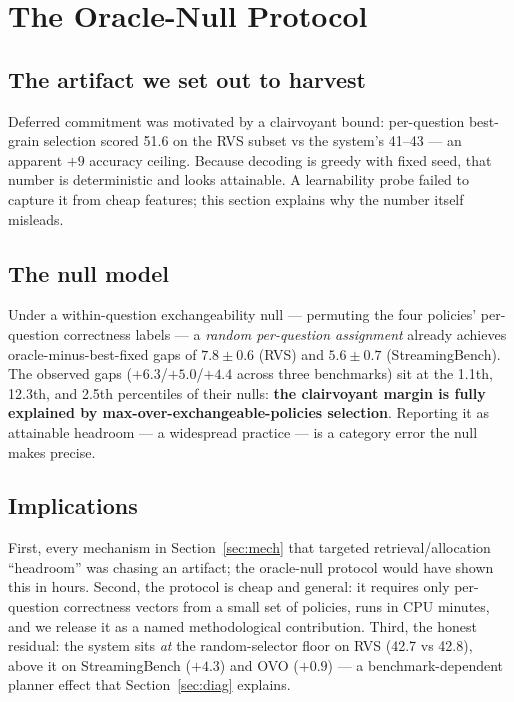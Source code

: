 \section{The Oracle-Null Protocol}
\label{sec:null}

\subsection{The artifact we set out to harvest}
Deferred commitment was motivated by a clairvoyant bound: per-question best-grain selection scored 51.6 on the RVS subset vs the system's 41--43 — an apparent $+9$ accuracy ceiling. Because decoding is greedy with fixed seed, that number is deterministic and looks attainable. A learnability probe failed to capture it from cheap features; this section explains why the number itself misleads.

\subsection{The null model}
Under a within-question exchangeability null — permuting the four policies' per-question correctness labels — a \emph{random per-question assignment} already achieves oracle-minus-best-fixed gaps of $7.8\pm0.6$ (RVS) and $5.6\pm0.7$ (StreamingBench). The observed gaps ($+6.3$/$+5.0$/$+4.4$ across three benchmarks) sit at the 1.1th, 12.3th, and 2.5th percentiles of their nulls: \textbf{the clairvoyant margin is fully explained by max-over-exchangeable-policies selection}. Reporting it as attainable headroom — a widespread practice — is a category error the null makes precise.

\subsection{Implications}
First, every mechanism in Section~\ref{sec:mech} that targeted retrieval/allocation ``headroom'' was chasing an artifact; the oracle-null protocol would have shown this in hours. Second, the protocol is cheap and general: it requires only per-question correctness vectors from a small set of policies, runs in CPU minutes, and we release it as a named methodological contribution. Third, the honest residual: the system sits \emph{at} the random-selector floor on RVS (42.7 vs 42.8), above it on StreamingBench ($+4.3$) and OVO ($+0.9$) — a benchmark-dependent planner effect that Section~\ref{sec:diag} explains.


